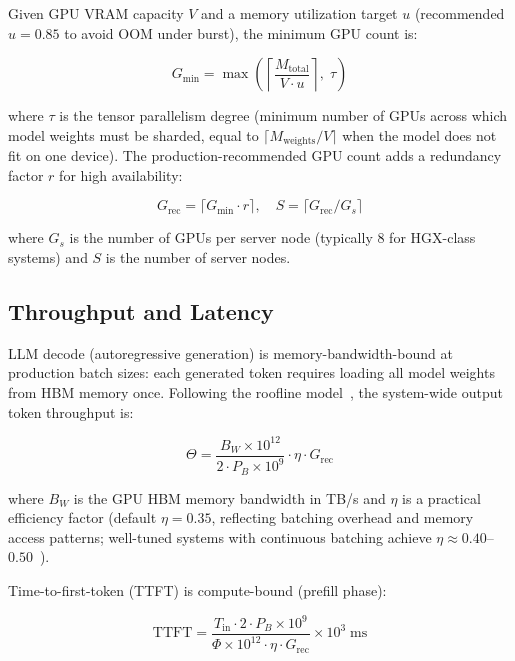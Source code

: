 \documentclass{article}
\begin{document}
Given GPU VRAM capacity $V$ and a memory utilization target $u$
(recommended $u{=}0.85$ to avoid OOM under burst), the minimum GPU count is:

\begin{equation}
  G_{\min} = \max\!\left(\left\lceil \frac{M_{\text{total}}}{V \cdot u} \right\rceil,\;
    \tau \right)
  \label{eq:min_gpus}
\end{equation}

\noindent where $\tau$ is the tensor parallelism degree (minimum number of
GPUs across which model weights must be sharded, equal to
$\lceil M_{\text{weights}} / V \rceil$ when the model does not fit on one
device). The production-recommended GPU count adds a redundancy factor $r$
for high availability:

\begin{equation}
  G_{\text{rec}} = \lceil G_{\min} \cdot r \rceil, \quad
  S = \lceil G_{\text{rec}} / G_s \rceil
  \label{eq:rec_gpus}
\end{equation}

\noindent where $G_s$ is the number of GPUs per server node (typically 8 for
HGX-class systems) and $S$ is the number of server nodes.

\subsection{Throughput and Latency}
\label{sec:perf}

LLM decode (autoregressive generation) is memory-bandwidth-bound at production
batch sizes: each generated token requires loading all model weights from HBM
memory once. Following the roofline model~\cite{williams2009roofline}, the
system-wide output token throughput is:

\begin{equation}
  \Theta = \frac{B_W \times 10^{12}}{2 \cdot P_B \times 10^9} \cdot \eta \cdot G_{\text{rec}}
  \label{eq:tps}
\end{equation}

\noindent where $B_W$ is the GPU HBM memory bandwidth in TB/s and $\eta$ is a
practical efficiency factor (default $\eta{=}0.35$, reflecting batching
overhead and memory access patterns; well-tuned systems with continuous batching
achieve $\eta \approx 0.40$--$0.50$~\cite{vllm2024bench}).

Time-to-first-token (TTFT) is compute-bound (prefill phase):

\begin{equation}
  \text{TTFT} = \frac{T_{\text{in}} \cdot 2 \cdot P_B \times 10^9}
    {\Phi \times 10^{12} \cdot \eta \cdot G_{\text{rec}}} \times 10^3 \;\text{ms}
  \label{eq:ttft}
\end{equation}
\end{document}
